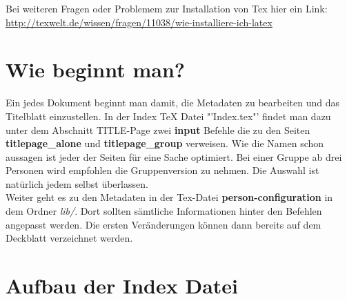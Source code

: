 Bei weiteren Fragen oder Problemem zur Installation von Tex hier ein Link:\\
\url{http://texwelt.de/wissen/fragen/11038/wie-installiere-ich-latex}

\section{Wie beginnt man?}

Ein jedes Dokument beginnt man damit, die Metadaten zu bearbeiten und das Titelblatt einzustellen. In der Index TeX Datei "'Index.tex"' findet man dazu unter dem Abschnitt TITLE-Page zwei \textbf{input} Befehle die zu den Seiten \textbf{titlepage\_alone} und \textbf{titlepage\_group} verweisen. Wie die Namen schon aussagen ist jeder der Seiten für eine Sache optimiert. Bei einer Gruppe ab drei Personen wird empfohlen die Gruppenversion zu nehmen. Die Auswahl ist natürlich jedem selbst überlassen.\\

Weiter geht es zu den Metadaten in der Tex-Datei \textbf{person-configuration} in dem Ordner \emph{lib/}. Dort sollten sämtliche Informationen hinter den Befehlen angepasst werden. Die ersten Veränderungen können dann bereits auf dem Deckblatt verzeichnet werden.


\section{Aufbau der Index Datei}

